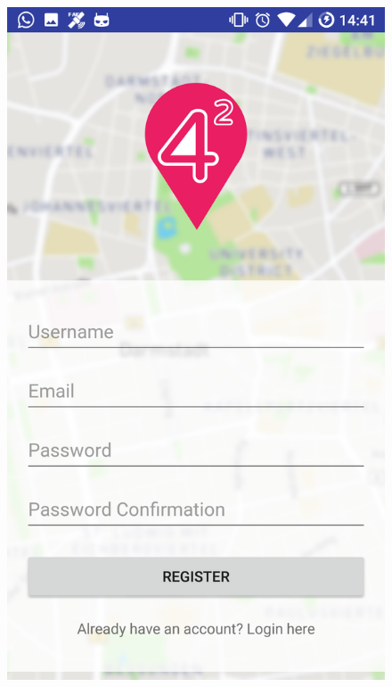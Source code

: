 \documentclass[11pt, accentcolor=tud1c]{tudreport}
\begin{document}
\begin{figure}[h]
\begin{minipage}{.3\textwidth}
  \includegraphics[width=.8\linewidth]{./res/register.png}
  \label{fig:register_view}
\end{minipage}
\begin{minipage}{.3\textwidth}
  \centering

\end{minipage}
\end{figure}
\end{document}
